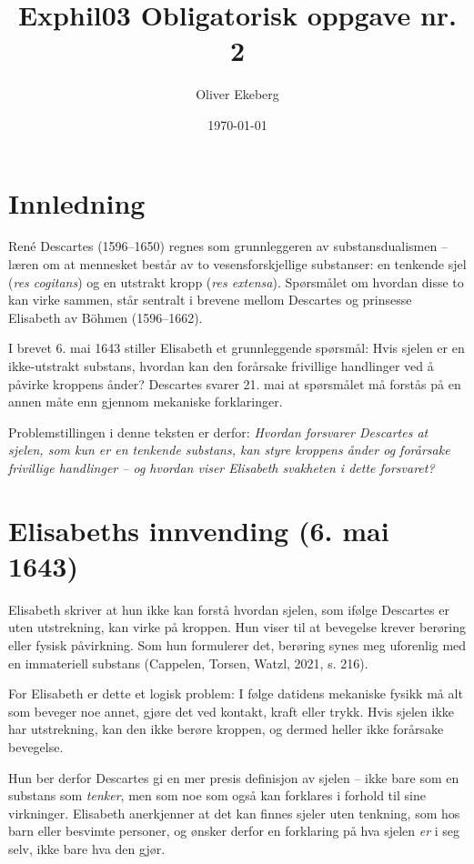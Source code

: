 \documentclass[12pt, a4paper]{article}
\title{Exphil03 Obligatorisk oppgave nr. 2}
\author{Oliver Ekeberg}
\date{\today}
\begin{document}
\maketitle

\tableofcontents

\section{Innledning}

René Descartes (1596–1650) regnes som grunnleggeren av substansdualismen – læren om at mennesket består av to vesensforskjellige substanser: en tenkende sjel (\textit{res cogitans}) og en utstrakt kropp (\textit{res extensa}). Spørsmålet om hvordan disse to kan virke sammen, står sentralt i brevene mellom Descartes og prinsesse Elisabeth av Böhmen (1596–1662). 

I brevet 6. mai 1643 stiller Elisabeth et grunnleggende spørsmål: Hvis sjelen er en ikke-utstrakt substans, hvordan kan den forårsake frivillige handlinger ved å påvirke kroppens ånder? Descartes svarer 21. mai at spørsmålet må forstås på en annen måte enn gjennom mekaniske forklaringer. 

Problemstillingen i denne teksten er derfor: \textit{Hvordan forsvarer Descartes at sjelen, som kun er en tenkende substans, kan styre kroppens ånder og forårsake frivillige handlinger – og hvordan viser Elisabeth svakheten i dette forsvaret?}

\section{Elisabeths innvending (6. mai 1643)}

Elisabeth skriver at hun ikke kan forstå hvordan sjelen, som ifølge Descartes er uten utstrekning, kan virke på kroppen. Hun viser til at bevegelse krever berøring eller fysisk påvirkning. Som hun formulerer det, berøring synes meg uforenlig med en immateriell substans (Cappelen, Torsen, Watzl, 2021, s. 216). 

For Elisabeth er dette et logisk problem: I følge datidens mekaniske fysikk må alt som beveger noe annet, gjøre det ved kontakt, kraft eller trykk. Hvis sjelen ikke har utstrekning, kan den ikke berøre kroppen, og dermed heller ikke forårsake bevegelse. 

Hun ber derfor Descartes gi en mer presis definisjon av sjelen – ikke bare som en substans som \textit{tenker}, men som noe som også kan forklares i forhold til sine virkninger. Elisabeth anerkjenner at det kan finnes sjeler uten tenkning, som hos barn eller besvimte personer, og ønsker derfor en forklaring på hva sjelen \textit{er} i seg selv, ikke bare hva den gjør.
\end{document}

